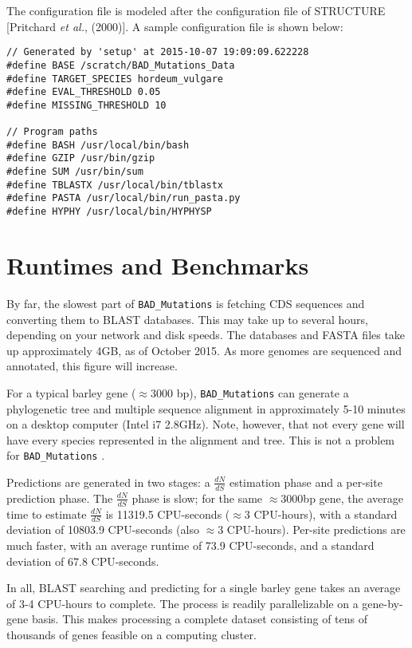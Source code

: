 \documentclass[12pt]{article}
\newcommand{\BM}{\texttt{BAD\_Mutations} }
\begin{document}
\par The configuration file is modeled after the configuration file of
STRUCTURE [Pritchard \textit{et al.}, (2000)]. A sample configuration file is
shown below:
\begin{Verbatim}[frame=single, fontsize=\small, rulecolor=\color{gray}]
// Generated by 'setup' at 2015-10-07 19:09:09.622228
#define BASE /scratch/BAD_Mutations_Data
#define TARGET_SPECIES hordeum_vulgare
#define EVAL_THRESHOLD 0.05
#define MISSING_THRESHOLD 10

// Program paths
#define BASH /usr/local/bin/bash
#define GZIP /usr/bin/gzip
#define SUM /usr/bin/sum
#define TBLASTX /usr/local/bin/tblastx
#define PASTA /usr/local/bin/run_pasta.py
#define HYPHY /usr/local/bin/HYPHYSP
\end{Verbatim}

\section*{Runtimes and Benchmarks}
\par By far, the slowest part of \BM is fetching CDS sequences and converting
them to BLAST databases. This may take up to several hours, depending on your
network and disk speeds. The databases and FASTA files take up approximately
4GB, as of October 2015. As more genomes are sequenced and annotated, this
figure will increase.

\par For a typical barley gene ($\approx$3000 bp), \BM can generate a
phylogenetic tree and multiple sequence alignment in approximately 5-10 minutes
on a desktop computer (Intel i7 2.8GHz). Note, however, that not every gene
will have every species represented in the alignment and tree. This is not a
problem for \BM.

\par Predictions are generated in two stages: a $\frac{dN}{dS}$ estimation
phase and a per-site prediction phase. The $\frac{dN}{dS}$ phase is slow; for
the same  $\approx$3000bp gene, the average time to estimate $\frac{dN}{dS}$
is 11319.5 CPU-seconds ($\approx$3 CPU-hours), with a standard deviation of
10803.9 CPU-seconds (also $\approx$3 CPU-hours). Per-site predictions are much
faster, with an average runtime of 73.9 CPU-seconds, and a standard deviation
of 67.8 CPU-seconds.

\par In all, BLAST searching and predicting for a single barley gene takes an
average of 3-4 CPU-hours to complete. The process is readily parallelizable on
a gene-by-gene basis. This makes processing a complete dataset consisting of
tens of thousands of genes feasible on a computing cluster.
\end{document}
